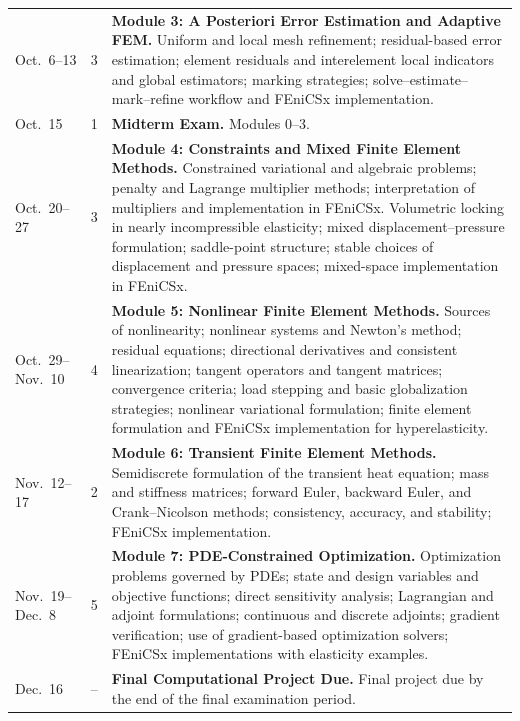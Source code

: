 \documentclass[12pt]{article}
\begin{document}
{\begin{longtable}{L{0.6in} C{0.48in} L{5.08in}}
Oct.\ 6--13 & 3 &
\textbf{Module 3: A Posteriori Error Estimation and Adaptive FEM.}
Uniform and local mesh refinement; residual-based error estimation; element residuals and interelement local indicators and global estimators; marking strategies; solve--estimate--mark--refine workflow and FEniCSx implementation.\\[0.18em]

Oct.\ 15 & 1 &
\textbf{Midterm Exam.} Modules 0--3.\\[0.18em]

Oct.\ 20--27 & 3 &
\textbf{Module 4: Constraints and Mixed Finite Element Methods.}
Constrained variational and algebraic problems; penalty and Lagrange multiplier methods; interpretation of multipliers and implementation in FEniCSx. Volumetric locking in nearly incompressible elasticity; mixed displacement--pressure formulation; saddle-point structure; stable choices of displacement and pressure spaces; mixed-space implementation in FEniCSx.\\[0.18em]

Oct.\ 29--Nov.\ 10 & 4 &
\textbf{Module 5: Nonlinear Finite Element Methods.}
Sources of nonlinearity; nonlinear systems and Newton's method; residual equations; directional derivatives and consistent linearization; tangent operators and tangent matrices; convergence criteria; load stepping and basic globalization strategies; nonlinear variational formulation; finite element formulation and FEniCSx implementation for hyperelasticity.\\[0.18em]

Nov.\ 12--17 & 2 &
\textbf{Module 6: Transient Finite Element Methods.}
Semidiscrete formulation of the transient heat equation; mass and stiffness matrices; forward Euler, backward Euler, and Crank--Nicolson methods; consistency, accuracy, and stability; FEniCSx implementation.\\[0.18em]

Nov.\ 19--Dec.\ 8 & 5 &
\textbf{Module 7: PDE-Constrained Optimization.}
Optimization problems governed by PDEs; state and design variables and objective functions; direct sensitivity analysis; Lagrangian and adjoint formulations; continuous and discrete adjoints; gradient verification; use of gradient-based optimization solvers; FEniCSx implementations with elasticity examples.\\[0.18em]

Dec.\ 16 & -- &
\textbf{Final Computational Project Due.} Final project due by the end of the final examination period.\\

\end{longtable}
}
\end{document}
